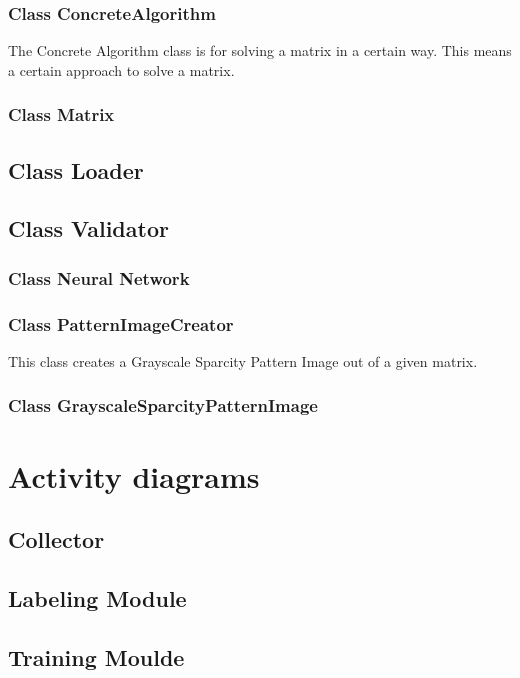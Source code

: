 \documentclass[parskip=full]{scrartcl}
\begin{document}
\subsubsection{Class ConcreteAlgorithm}
The Concrete Algorithm class is for solving a matrix in a certain way. This means a certain approach to solve a matrix.
\subsubsection{Class Matrix}

\subsection{Class Loader}

\subsection{Class Validator}

\subsubsection{Class Neural Network}

\subsubsection{Class PatternImageCreator}
This class creates a Grayscale Sparcity Pattern Image out of a given matrix.
\subsubsection{Class GrayscaleSparcityPatternImage}

\section{Activity diagrams}


\subsection{Collector}
\subsection{Labeling Module}
\subsection{Training Moulde}

\end{document}

